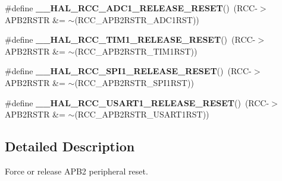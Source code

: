 \begin{DoxyCompactItemize}
\item 
\mbox{\label{group___r_c_c___a_p_b2___force___release___reset_ga681299b233339aa39a30fa5589cac5bc}} 
\#define {\bfseries \+\_\+\+\_\+\+H\+A\+L\+\_\+\+R\+C\+C\+\_\+\+A\+D\+C1\+\_\+\+R\+E\+L\+E\+A\+S\+E\+\_\+\+R\+E\+S\+ET}()~(R\+CC-\/$>$A\+P\+B2\+R\+S\+TR \&= $\sim$(R\+C\+C\+\_\+\+A\+P\+B2\+R\+S\+T\+R\+\_\+\+A\+D\+C1\+R\+ST))
\item 
\mbox{\label{group___r_c_c___a_p_b2___force___release___reset_ga1857f223177c9548ce1bae9753e0a7b4}} 
\#define {\bfseries \+\_\+\+\_\+\+H\+A\+L\+\_\+\+R\+C\+C\+\_\+\+T\+I\+M1\+\_\+\+R\+E\+L\+E\+A\+S\+E\+\_\+\+R\+E\+S\+ET}()~(R\+CC-\/$>$A\+P\+B2\+R\+S\+TR \&= $\sim$(R\+C\+C\+\_\+\+A\+P\+B2\+R\+S\+T\+R\+\_\+\+T\+I\+M1\+R\+ST))
\item 
\mbox{\label{group___r_c_c___a_p_b2___force___release___reset_gad7b4bc8c8a9146529a175c45eecf25e5}} 
\#define {\bfseries \+\_\+\+\_\+\+H\+A\+L\+\_\+\+R\+C\+C\+\_\+\+S\+P\+I1\+\_\+\+R\+E\+L\+E\+A\+S\+E\+\_\+\+R\+E\+S\+ET}()~(R\+CC-\/$>$A\+P\+B2\+R\+S\+TR \&= $\sim$(R\+C\+C\+\_\+\+A\+P\+B2\+R\+S\+T\+R\+\_\+\+S\+P\+I1\+R\+ST))
\item 
\mbox{\label{group___r_c_c___a_p_b2___force___release___reset_ga243061674e38d05d222697046d43813a}} 
\#define {\bfseries \+\_\+\+\_\+\+H\+A\+L\+\_\+\+R\+C\+C\+\_\+\+U\+S\+A\+R\+T1\+\_\+\+R\+E\+L\+E\+A\+S\+E\+\_\+\+R\+E\+S\+ET}()~(R\+CC-\/$>$A\+P\+B2\+R\+S\+TR \&= $\sim$(R\+C\+C\+\_\+\+A\+P\+B2\+R\+S\+T\+R\+\_\+\+U\+S\+A\+R\+T1\+R\+ST))
\end{DoxyCompactItemize}


\subsection{Detailed Description}
Force or release A\+P\+B2 peripheral reset. 

